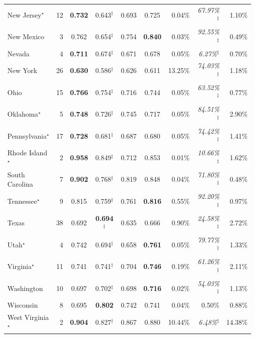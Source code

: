 \begin{longtable}{l r cccc rrr}
New Jersey$^{\star}$ & 12 & \textbf{0.732} & 0.643$^{\ddagger}$ & 0.693 & 0.725 & 0.04\% & \textit{67.97\%}$^{\ddagger}$ & 1.10\% \\
New Mexico & 3 & 0.762 & 0.654$^{\ddagger}$ & 0.754 & \textbf{0.840} & 0.03\% & \textit{92.55\%}$^{\ddagger}$ & 0.49\% \\
Nevada & 4 & \textbf{0.711} & 0.674$^{\ddagger}$ & 0.671 & 0.678 & 0.05\% & \textit{6.27\%}$^{\ddagger}$ & 0.70\% \\
New York & 26 & \textbf{0.630} & 0.586$^{\ddagger}$ & 0.626 & 0.611 & 13.25\% & \textit{74.03\%}$^{\ddagger}$ & 1.18\% \\
Ohio & 15 & \textbf{0.766} & 0.754$^{\ddagger}$ & 0.716 & 0.744 & 0.05\% & \textit{63.52\%}$^{\ddagger}$ & 0.77\% \\
Oklahoma$^{\star}$ & 5 & \textbf{0.748} & 0.726$^{\ddagger}$ & 0.745 & 0.717 & 0.05\% & \textit{84.51\%}$^{\ddagger}$ & 2.90\% \\
Pennsylvania$^{\star}$ & 17 & \textbf{0.728} & 0.681$^{\ddagger}$ & 0.687 & 0.680 & 0.05\% & \textit{74.42\%}$^{\ddagger}$ & 1.41\% \\
Rhode Island$^{\star}$ & 2 & \textbf{0.958} & 0.849$^{\ddagger}$ & 0.712 & 0.853 & 0.01\% & \textit{10.66\%}$^{\ddagger}$ & 1.62\% \\
South Carolina & 7 & \textbf{0.902} & 0.768$^{\ddagger}$ & 0.819 & 0.848 & 0.04\% & \textit{71.80\%}$^{\ddagger}$ & 0.48\% \\
Tennessee$^{\star}$ & 9 & 0.815 & 0.759$^{\ddagger}$ & 0.761 & \textbf{0.816} & 0.55\% & \textit{92.20\%}$^{\ddagger}$ & 0.97\% \\
Texas & 38 & 0.692 & \textbf{0.694}$^{\ddagger}$ & 0.635 & 0.666 & 0.90\% & \textit{24.58\%}$^{\ddagger}$ & 2.72\% \\
Utah$^{\star}$ & 4 & 0.742 & 0.694$^{\ddagger}$ & 0.658 & \textbf{0.761} & 0.05\% & \textit{79.77\%}$^{\ddagger}$ & 1.33\% \\
Virginia$^{\star}$ & 11 & 0.741 & 0.741$^{\ddagger}$ & 0.704 & \textbf{0.746} & 0.19\% & \textit{61.26\%}$^{\ddagger}$ & 2.11\% \\
Washington & 10 & 0.697 & 0.702$^{\ddagger}$ & 0.698 & \textbf{0.716} & 0.02\% & \textit{54.03\%}$^{\ddagger}$ & 1.13\% \\
Wisconsin & 8 & 0.695 & \textbf{0.802} & 0.742 & 0.741 & 0.04\% & 0.50\% & 0.88\% \\
West Virginia$^{\star}$ & 2 & \textbf{0.904} & 0.827$^{\ddagger}$ & 0.867 & 0.880 & 10.44\% & \textit{6.48\%}$^{\ddagger}$ & 14.38\% \\
\end{longtable}


